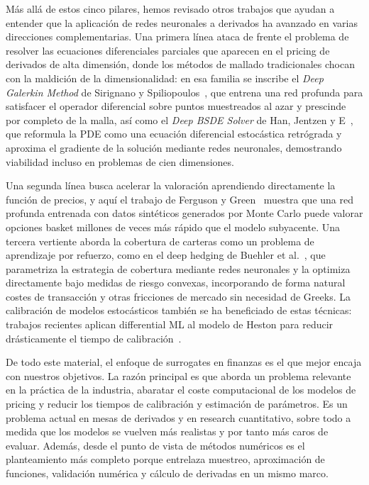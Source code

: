 \documentclass[11pt,a4paper]{article}
\begin{document}
Más allá de estos cinco pilares, hemos revisado otros trabajos que ayudan a entender que la aplicación de redes neuronales a derivados ha avanzado en varias direcciones complementarias. Una primera línea ataca de frente el problema de resolver las ecuaciones diferenciales parciales que aparecen en el pricing de derivados de alta dimensión, donde los métodos de mallado tradicionales chocan con la maldición de la dimensionalidad: en esa familia se inscribe el \emph{Deep Galerkin Method} de Sirignano y Spiliopoulos~\cite{sirignano2018}, que entrena una red profunda para satisfacer el operador diferencial sobre puntos muestreados al azar y prescinde por completo de la malla, así como el \emph{Deep BSDE Solver} de Han, Jentzen y E~\cite{han2018}, que reformula la PDE como una ecuación diferencial estocástica retrógrada y aproxima el gradiente de la solución mediante redes neuronales, demostrando viabilidad incluso en problemas de cien dimensiones.

Una segunda línea busca acelerar la valoración aprendiendo directamente la función de precios, y aquí el trabajo de Ferguson y Green~\cite{ferguson2018} muestra que una red profunda entrenada con datos sintéticos generados por Monte Carlo puede valorar opciones basket millones de veces más rápido que el modelo subyacente. Una tercera vertiente aborda la cobertura de carteras como un problema de aprendizaje por refuerzo, como en el deep hedging de Buehler et al.~\cite{buehler2019}, que parametriza la estrategia de cobertura mediante redes neuronales y la optimiza directamente bajo medidas de riesgo convexas, incorporando de forma natural costes de transacción y otras fricciones de mercado sin necesidad de Greeks. La calibración de modelos estocásticos también se ha beneficiado de estas técnicas: trabajos recientes aplican differential ML al modelo de Heston para reducir drásticamente el tiempo de calibración~\cite{dlcalib2023}.

De todo este material, el enfoque de surrogates en finanzas es el que mejor encaja con nuestros objetivos. La razón principal es que aborda un problema relevante en la práctica de la industria, abaratar el coste computacional de los modelos de pricing y reducir los tiempos de calibración y estimación de parámetros. Es un problema actual en mesas de derivados y en research cuantitativo, sobre todo a medida que los modelos se vuelven más realistas y por tanto más caros de evaluar. Además, desde el punto de vista de métodos numéricos es el planteamiento más completo porque entrelaza muestreo, aproximación de funciones, validación numérica y cálculo de derivadas en un mismo marco.
\end{document}
